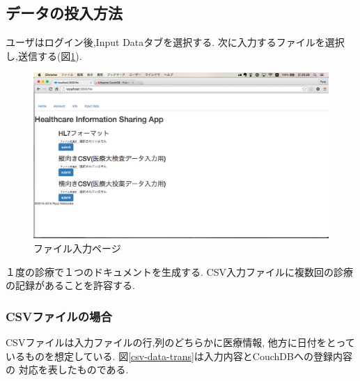 \subsection{データの投入方法}
	ユーザはログイン後,Input Dataタブを選択する.
	次に入力するファイルを選択し,送信する(図\ref{fileiopage}).

	\begin{figure}[htbp]
			\includegraphics[width=15cm, bb=0 0 1366 1078, clip]{./gazou/fileiopage.png}
		\caption{ファイル入力ページ}
		\label{fileiopage}
	\end{figure}

	１度の診療で１つのドキュメントを生成する.
	CSV入力ファイルに複数回の診療の記録があることを許容する.

		\subsubsection{CSVファイルの場合}
			CSVファイルは入力ファイルの行,列のどちらかに医療情報,
			他方に日付をとっているものを想定している.
			図\ref{csv-data-trans}は入力内容とCouchDBへの登録内容の
			対応を表したものである.

